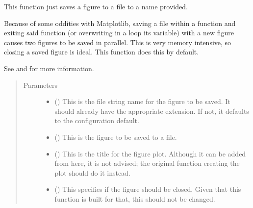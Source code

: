 \documentclass[letterpaper,10pt,english]{sphinxmanual}
\begin{document}

\begin{fulllineitems}
\label{\detokenize{docstrings/ifa_smeargle.plotting.base_functions:ifa_smeargle.plotting.base_functions.write_plot_file}}
This function just saves a figure to a file to a name
provided.

Because of some oddities with Matplotlib, saving a file within
a function and exiting said function (or overwriting in a loop
its variable) with a new figure causes two figures to be saved
in parallel. This is very memory intensive, so closing a saved
figure is ideal. This function does this by default.

See  and
 for more information.
\begin{quote}\begin{description}
\item[{Parameters}] \leavevmode\begin{itemize}
\item {} 
 () \textendash{} This is the file string name for the figure to be saved. It
should already have the appropriate extension. If not, it
defaults to the configuration default.

\item {} 
 () \textendash{} This is the figure to be saved to a file.

\item {} 
 (\sphinxstyleliteralemphasis{\sphinxupquote{ (}}\sphinxstyleliteralemphasis{\sphinxupquote{)}}) \textendash{} This is the title for the figure plot. Although it can be
added from here, it is not advised; the original function
creating the plot should do it instead.

\item {} 
 (\sphinxstyleliteralemphasis{\sphinxupquote{ (}}\sphinxstyleliteralemphasis{\sphinxupquote{)}}) \textendash{} This specifies if the figure should be closed. Given that
this function is built for that, this should not be changed.


\end{itemize}
\end{description}
\end{quote}
\end{fulllineitems}
\end{document}
